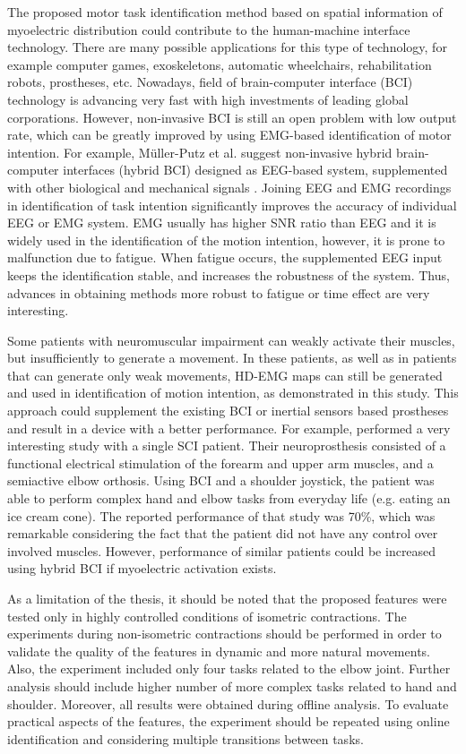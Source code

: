 The proposed motor task identification method based on spatial information of myoelectric distribution could contribute to the human-machine interface technology. There are many possible applications for this type of technology, for example computer games, exoskeletons, automatic wheelchairs, rehabilitation robots, prostheses, etc. Nowadays, field of brain-computer interface (BCI) technology is advancing very fast with high investments of leading global corporations. However, non-invasive BCI is still an open problem with low output rate, which can be greatly improved by using EMG-based identification of motor intention. For example, 
Müller-Putz et al. suggest non-invasive hybrid brain-computer interfaces (hybrid BCI) designed as EEG-based system, supplemented with other biological and mechanical signals  \citep{Muller-Putz2015}. Joining EEG and EMG recordings in identification of task intention significantly improves the accuracy of individual EEG or EMG system. EMG usually has higher SNR ratio than EEG and it is widely used in the identification of the motion intention, however, it is prone to malfunction due to fatigue. When fatigue occurs, the supplemented EEG input keeps the identification stable, and increases the robustness of the system. Thus, advances in obtaining methods more robust to fatigue or time effect are very interesting.

Some patients with neuromuscular impairment can weakly activate their muscles, but insufficiently to generate a movement. In these patients, as well as in patients that can generate only weak movements, HD-EMG maps can still be generated and used in identification of motion intention, as demonstrated in this study. This approach could supplement the existing BCI or inertial sensors based prostheses and result in a device with a better performance. For example, \citet{Rohm2013} performed a very interesting study with a single SCI patient. Their neuroprosthesis consisted of a functional electrical stimulation of the forearm and upper arm muscles, and a semiactive elbow orthosis. Using BCI and a shoulder joystick, the patient was able to perform complex hand and elbow tasks from everyday life (e.g. eating an ice cream cone). The reported performance of that study was 70\%, which was remarkable considering the fact that the patient did not have any control over involved muscles. However, performance of similar patients could be increased using hybrid BCI if myoelectric activation exists.

As a limitation of the thesis, it should be noted that the proposed features were tested only in highly controlled conditions of isometric contractions. The experiments during non-isometric contractions should be performed in order to validate the quality of the features in dynamic and more natural movements. Also, the experiment included only four tasks related to the elbow joint. Further analysis should include higher number of more complex tasks related to hand and shoulder. Moreover, all results were obtained during offline analysis. To evaluate practical aspects of the features, the experiment should be repeated using online identification and considering multiple transitions between tasks.


